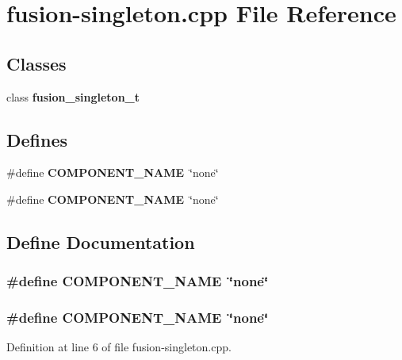 \section{fusion-singleton.cpp File Reference}
\label{fusion-singleton_8cpp}
\subsection*{Classes}
\begin{CompactItemize}
\item 
class {\bf fusion\_\-singleton\_\-t}
\end{CompactItemize}
\subsection*{Defines}
\begin{CompactItemize}
\item 
\#define {\bf COMPONENT\_\-NAME}~\char`\"{}none\char`\"{}
\item 
\#define {\bf COMPONENT\_\-NAME}~\char`\"{}none\char`\"{}
\end{CompactItemize}


\subsection{Define Documentation}
\subsubsection[{COMPONENT\_\-NAME}]{\setlength{\rightskip}{0pt plus 5cm}\#define COMPONENT\_\-NAME~\char`\"{}none\char`\"{}}\label{zesto-bpred_8cpp_9146ade7ce24e3db226a973a59063892}


\subsubsection[{COMPONENT\_\-NAME}]{\setlength{\rightskip}{0pt plus 5cm}\#define COMPONENT\_\-NAME~\char`\"{}none\char`\"{}}\label{fusion-singleton_8cpp_9146ade7ce24e3db226a973a59063892}




Definition at line 6 of file fusion-singleton.cpp.